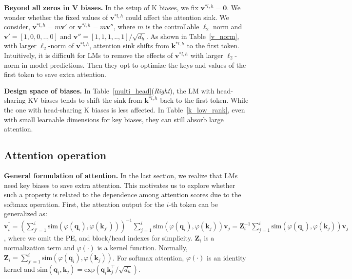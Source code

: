 \documentclass{article} \usepackage{iclr2025_conference,times}
\begin{document}
\textbf{Beyond all zeros in V biases.} In the setup of K biases, we fix $\boldsymbol{v}^{*l,h}=\boldsymbol{0}$. We wonder whether the fixed values of $\boldsymbol{v}^{*l,h}$ could affect the attention sink. We consider, $\boldsymbol{v}^{*l,h}=m\boldsymbol{v}'$ or $\boldsymbol{v}^{*l,h}=m\boldsymbol{v}''$, where $m$ is the controllable $\ell_2$ norm and $\boldsymbol{v}'=[1,0,0,..,0]$ and $\boldsymbol{v}''=[1,1,1,..,1]/ \sqrt{d_h}$. As shown in Table~\ref{v_norm}, with larger $\ell_2$-norm of $\boldsymbol{v}^{*l,h}$, attention sink shifts from $\boldsymbol{k}^{*l,h}$ to the first token. Intuitively, it is difficult for LMs to remove the effects of $\boldsymbol{v}^{*l,h}$ with larger $\ell_2$-norm in model predictions. Then they opt to optimize the keys and values of the first token to save extra attention. 

\textbf{Design space of biases.} In Table~\ref{multi_head}(\emph{Right}), the LM with head-sharing KV biases tends to shift the sink from $\boldsymbol{k}^{*l,h}$ back to the first token. While the one with head-sharing K biases is less affected. In Table~\ref{k_low_rank}, even with small learnable dimensions for key biases, they can still absorb large attention.













\vspace{-0.2cm}
\subsection{Attention operation}
\vspace{-0.2cm}
\textbf{General formulation of attention.} In the last section, we realize that LMs need key biases to save extra attention. This motivates us to explore whether such a property is related to the dependence among attention scores due to the softmax operation. First, the attention output for the $i$-th token can be generalized as: $\boldsymbol{v}_i^{\dagger}=\left(\sum_{j'=1}^i\textrm{sim}(\varphi(\boldsymbol{q}_i)\textrm{,}\,\varphi(\boldsymbol{k}_{j'}))\right)^{-1}\sum_{j=1}^i\textrm{sim}(\varphi(\boldsymbol{q}_i)\textrm{,}\,\varphi(\boldsymbol{k}_j))\boldsymbol{v}_j=\boldsymbol{Z}_i^{-1}\sum_{j=1}^i\textrm{sim}(\varphi(\boldsymbol{q}_i)\textrm{,}\,\varphi(\boldsymbol{k}_j))\boldsymbol{v}_j$,
where we omit the PE, and block/head indexes for simplicity. $\boldsymbol{Z}_i$ is a normalization term and $\varphi(\cdot)$ is a kernel function. Normally, $\boldsymbol{Z}_i=\sum_{j'=1}^i\textrm{sim}(\varphi(\boldsymbol{q}_i)\textrm{,}\,\varphi(\boldsymbol{k}_j))$. For softmax attention, $\varphi(\cdot)$ is an identity kernel and $\textrm{sim}(\boldsymbol{q}_i\textrm{,}\,\boldsymbol{k}_j)=\textrm{exp}(\boldsymbol{q}_i\boldsymbol{k}_j^\top/\sqrt{d_h})$.
\end{document}
